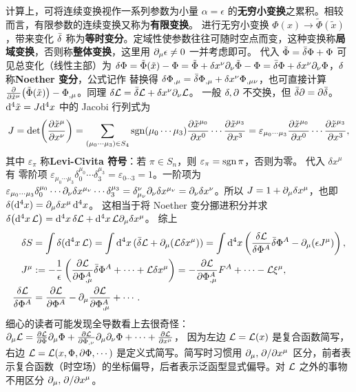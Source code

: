 计算上，可将连续变换视作一系列参数为小量 $\alpha=\epsilon$ 的\textbf{无穷小变换}之累积。相较而言，有限参数的连续变换又称为\textbf{有限变换}。
进行无穷小变换 $\Phi(x)\to\tilde\Phi(\tilde x)$，带来变化
$\bar\var$ 称为\textbf{等时变分}。定域性使参数往往可随时空点而变，这种变换称\textbf{局域变换}，否则称\textbf{整体变换}，这里用 $\partial_\mu\epsilon\ne 0$ 一并考虑即可。
代入 $\tilde\Phi=\bar\var\Phi+\Phi$ 可见总变化（线性主部）为 $\var \Phi=\tilde\Phi(\tilde x)- \Phi=\tilde\Phi + \var x^\nu\partial_\nu\tilde{\Phi} - \Phi=\bar\var\Phi+\var x^\nu\partial_\nu\Phi$，$\var$ 称\textbf{Noether 变分}，公式记作
替换得 $\delta\Phi_{,\mu}=\bar\var\Phi_{,\mu}+ \delta x^\nu\Phi_{,\mu\nu}$，也可直接计算 $\pdv{\tilde x^\mu}(\tilde \Phi(\tilde x))-\Phi_{,\mu}$。同理 $\delta\mathcal{L}=\bar\var\mathcal{L}+\delta x^\nu\partial_\nu\mathcal{L}$。
一般 $\var,\partial$ 不交换，但 $\bar\var\partial =\partial\bar\var$。
$\dd[4]\tilde x=J\dd[4]x$ 中的 Jacobi 行列式为
\[
J=\det(\pdv{\tilde x^\mu}{x^\nu})=\sum_{(\mu_0\cdots \mu_3)\in S_4}\operatorname{sgn}(\mu_0\cdots \mu_3)\pdv{\tilde x^{\mu_0}}{x^0}\cdots\pdv{\tilde x^{\mu_3}}{x^3}=\varepsilon_{\mu_0\cdots \mu_3}\pdv{\tilde x^{\mu_0}}{x^0}\cdots\pdv{\tilde x^{\mu_3}}{x^3},
\]
其中 $\varepsilon_{\pi}$ 称\textbf{Levi-Civita 符号}：若 $\pi\in S_n$，则 $\varepsilon_{\pi}=\operatorname{sgn} \pi$，否则为零。
代入 $\delta x^\mu$ 有
零阶项 $\varepsilon_{\mu_0\cdots \mu_3} \delta_0^{\mu_0}\cdots\delta_3^{\mu_3}=\varepsilon_{0\cdots 3}=1$。一阶项为 $\varepsilon_{\mu_0\cdots \mu_3}\delta_0^{\mu_0}\cdots\partial_\nu\delta x^{\mu_\nu}\cdots\delta_3^{\mu_3}=\delta_{\mu_\nu}^{\nu}\partial_\nu\delta x^{\mu_\nu}=\partial_\nu\delta x^\nu$。所以 $J=1+\partial_\mu\delta x^\mu$，也即 $\delta(\dd[4]{x})=\partial_\mu\delta x^\mu\dd[4]{x}$。
这相当于将 Noether 变分挪进积分并求 $\var(\dd[4]{x}\mathcal{L}) = \dd[4]{x}\var\mathcal{L} + \dd[4]{x}\mathcal{L}\partial_\mu\delta x^\mu$。
综上
\begin{align*}
    \delta S &=\int \delta(\d[4]{x}\Lag)=\int \d[4]{x} (\bar\var\Lag+\p_\mu(\Lag\delta x^\mu))=\int\d[4]{x}\left(\fdv{\Lag}{\Phi^A}\bar\var\Phi^A - \p_\mu(\epsilon J^\mu)\right),\\
    J^\mu &:=-\frac{1}{\epsilon}\left(\pdv{\Lag}{\Phi^A_{,\mu}}\bar\var\Phi^A+\cdots+\Lag\delta x^\mu\right)=-\pdv{\Lag}{\Phi^A_{,\mu}} F^A+\cdots-\Lag \xi^\mu,\\
    \fdv{\Lag}{\Phi^A}&=\pdv{\Lag}{\Phi^A}-\p_\mu\pdv{\Lag}{\Phi^A_{,\mu}}+\cdots.
\end{align*} 
细心的读者可能发现全导数看上去很奇怪：$\partial_\mu\mathcal{L} = \pdv{\mathcal{L}}{\Phi}\partial_\mu\Phi + \pdv{\mathcal{L}}{\Phi_{,\nu}}\partial_\mu\partial_\nu\Phi + \cdots + \pdv{\mathcal{L}}{x^\mu}$，
因为左边 $\mathcal{L}=\mathcal{L}(x)$ 是复合函数简写，右边 $\mathcal{L}=\mathcal{L}(x,\Phi,\partial\Phi,\cdots)$ 是定义式简写。简写时习惯用 $\partial_\mu,\pdv*{x^\mu}$ 区分，前者表示复合函数（时空场）的坐标偏导，后者表示泛函型显式偏导。对 $\mathcal{L}$ 之外的事物不用区分 $\partial_\mu,\pdv*{x^\mu}$。


